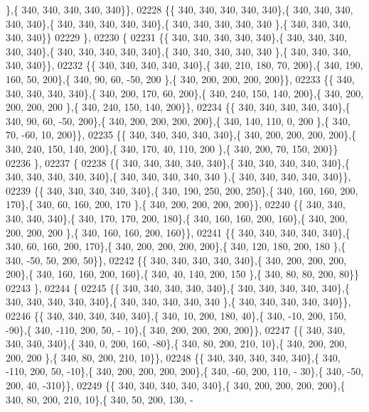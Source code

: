 \begin{DoxyCode}
      \},\{ 340, 340, 340, 340, 340\}\},
02228 \{\{ 340, 340, 340, 340, 340\},\{ 340, 340, 340, 340, 340\},\{ 340, 340, 340, 340, 340\},\{ 340, 340, 340, 340, 340
      \},\{ 340, 340, 340, 340, 340\}\}
02229 \},
02230 \{
02231 \{\{ 340, 340, 340, 340, 340\},\{ 340, 340, 340, 340, 340\},\{ 340, 340, 340, 340, 340\},\{ 340, 340, 340, 340, 340
      \},\{ 340, 340, 340, 340, 340\}\},
02232 \{\{ 340, 340, 340, 340, 340\},\{ 340, 210, 180,  70, 200\},\{ 340, 190, 160,  50, 200\},\{ 340,  90,  60, -50, 200
      \},\{ 340, 200, 200, 200, 200\}\},
02233 \{\{ 340, 340, 340, 340, 340\},\{ 340, 200, 170,  60, 200\},\{ 340, 240, 150, 140, 200\},\{ 340, 200, 200, 200, 200
      \},\{ 340, 240, 150, 140, 200\}\},
02234 \{\{ 340, 340, 340, 340, 340\},\{ 340,  90,  60, -50, 200\},\{ 340, 200, 200, 200, 200\},\{ 340, 140, 110,   0, 200
      \},\{ 340,  70, -60,  10, 200\}\},
02235 \{\{ 340, 340, 340, 340, 340\},\{ 340, 200, 200, 200, 200\},\{ 340, 240, 150, 140, 200\},\{ 340, 170,  40, 110, 200
      \},\{ 340, 200,  70, 150, 200\}\}
02236 \},
02237 \{
02238 \{\{ 340, 340, 340, 340, 340\},\{ 340, 340, 340, 340, 340\},\{ 340, 340, 340, 340, 340\},\{ 340, 340, 340, 340, 340
      \},\{ 340, 340, 340, 340, 340\}\},
02239 \{\{ 340, 340, 340, 340, 340\},\{ 340, 190, 250, 200, 250\},\{ 340, 160, 160, 200, 170\},\{ 340,  60, 160, 200, 170
      \},\{ 340, 200, 200, 200, 200\}\},
02240 \{\{ 340, 340, 340, 340, 340\},\{ 340, 170, 170, 200, 180\},\{ 340, 160, 160, 200, 160\},\{ 340, 200, 200, 200, 200
      \},\{ 340, 160, 160, 200, 160\}\},
02241 \{\{ 340, 340, 340, 340, 340\},\{ 340,  60, 160, 200, 170\},\{ 340, 200, 200, 200, 200\},\{ 340, 120, 180, 200, 180
      \},\{ 340, -50,  50, 200,  50\}\},
02242 \{\{ 340, 340, 340, 340, 340\},\{ 340, 200, 200, 200, 200\},\{ 340, 160, 160, 200, 160\},\{ 340,  40, 140, 200, 150
      \},\{ 340,  80,  80, 200,  80\}\}
02243 \},
02244 \{
02245 \{\{ 340, 340, 340, 340, 340\},\{ 340, 340, 340, 340, 340\},\{ 340, 340, 340, 340, 340\},\{ 340, 340, 340, 340, 340
      \},\{ 340, 340, 340, 340, 340\}\},
02246 \{\{ 340, 340, 340, 340, 340\},\{ 340,  10, 200, 180,  40\},\{ 340, -10, 200, 150, -90\},\{ 340, -110, 200,  50, -
      10\},\{ 340, 200, 200, 200, 200\}\},
02247 \{\{ 340, 340, 340, 340, 340\},\{ 340,   0, 200, 160, -80\},\{ 340,  80, 200, 210,  10\},\{ 340, 200, 200, 200, 200
      \},\{ 340,  80, 200, 210,  10\}\},
02248 \{\{ 340, 340, 340, 340, 340\},\{ 340, -110, 200,  50, -10\},\{ 340, 200, 200, 200, 200\},\{ 340, -60, 200, 110, -
      30\},\{ 340, -50, 200,  40, -310\}\},
02249 \{\{ 340, 340, 340, 340, 340\},\{ 340, 200, 200, 200, 200\},\{ 340,  80, 200, 210,  10\},\{ 340,  50, 200, 130, -

\end{DoxyCode}

